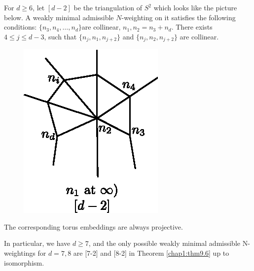  \begin{lemma}\label{chap1:lem9.8}
For $d \geq 6$, let $[d-2]$ be the triangulation of $S^2$ which looks
like the picture below. A weakly minimal admissible $N$-weighting on it
satisfies the following conditions: 
$\{n_3, n_4, \ldots , n_d\}$\pageoriginale are collinear, $n_1,
n_2=n_3 + n_d$. There exists $4 \leq j \leq d -3$, such that
$\{n_j, n_1, n_{j+2}\}$ and $\{n_j, n_2, n_{j+2}\}$ are collinear.   

\begin{figure}[H]
\centering 
\includegraphics{vol58-fig/fig58-42.eps} 
\end{figure}
The corresponding torus embeddings are always projective.
 
\noindent
In particular, we have $d \geq 7$, and the only possible weakly
minimal admissible N-weightings for $d=7, 8$ are [7-2] 
and [8-2] in Theorem \ref{chap1:thm9.6} up to isomorphism.
\end{lemma}

